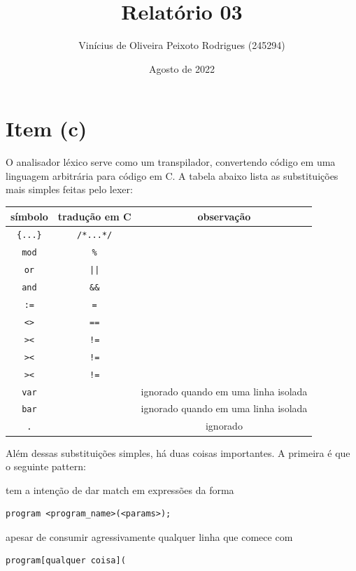 \documentclass{article}
\title{Relatório 03}
\author{Vinícius de Oliveira Peixoto Rodrigues (245294)}
\date{Agosto de 2022}
\begin{document}
\maketitle

\section*{Item (c)}

O analisador léxico serve como um transpilador, convertendo código em uma linguagem arbitrária para código em C. A tabela abaixo lista as substituições mais simples feitas pelo lexer:

\begin{center}
\begin{tabular}{ |c|c|c| }
    \hline
    \textbf{símbolo} & \textbf{tradução em C} & \textbf{observação} \\ \hline
    \texttt{\{...\}} & \texttt{/*...*/} & \\ \hline
    \texttt{mod} & \texttt{\%} & \\ \hline
    \texttt{or} & \texttt{||} & \\ \hline
    \texttt{and} & \texttt{\&\&} & \\ \hline
    \texttt{:=} & \texttt{=} & \\ \hline
    \texttt{<>} & \texttt{==} & \\ \hline
    \texttt{><} & \texttt{!=} & \\ \hline
    \texttt{><} & \texttt{!=} & \\ \hline
    \texttt{><} & \texttt{!=} & \\ \hline
    \texttt{var} &  & ignorado quando em uma linha isolada \\ \hline
    \texttt{bar} &  & ignorado quando em uma linha isolada \\ \hline
    \texttt{.} &  & ignorado \\ \hline
\end{tabular}
\end{center}

Além dessas substituições simples, há duas coisas importantes. A primeira é que o seguinte pattern:

tem a intenção de dar match em expressões da forma
\begin{verbatim}
program <program_name>(<params>);
\end{verbatim}

apesar de consumir agressivamente qualquer linha que comece com

\begin{verbatim}
program[qualquer coisa](
\end{verbatim}
\end{document}
